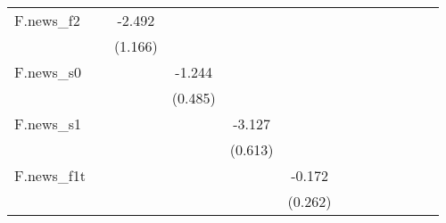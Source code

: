 {\begin{tabular}{l*{12}{c}}
\addlinespace
F.news\_f2   &                     &      -2.492\sym{*}  &                     &                     &                     &                     &                     &                     &                     &                     &                     &                     \\
            &                     &     (1.166)         &                     &                     &                     &                     &                     &                     &                     &                     &                     &                     \\
\addlinespace
F.news\_s0   &                     &                     &      -1.244\sym{**} &                     &                     &                     &                     &                     &                     &                     &                     &                     \\
            &                     &                     &     (0.485)         &                     &                     &                     &                     &                     &                     &                     &                     &                     \\
\addlinespace
F.news\_s1   &                     &                     &                     &      -3.127\sym{***}&                     &                     &                     &                     &                     &                     &                     &                     \\
            &                     &                     &                     &     (0.613)         &                     &                     &                     &                     &                     &                     &                     &                     \\
\addlinespace
F.news\_f1t  &                     &                     &                     &                     &      -0.172         &                     &                     &                     &                     &                     &                     &                     \\
            &                     &                     &                     &                     &     (0.262)         &                     &                     &                     &                     &                     &                     &                     \\

\end{tabular}}
